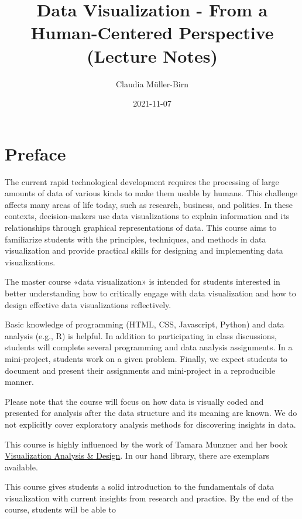 \documentclass[
]{book}
\title{Data Visualization - From a Human-Centered Perspective (Lecture Notes)}
\author{Claudia Müller-Birn}
\date{2021-11-07}
\begin{document}
\maketitle

{
\setcounter{tocdepth}{2}
\tableofcontents
}
\hypertarget{preface}{%
\chapter*{Preface}\label{preface}}


The current rapid technological development requires the processing of large amounts of data of various kinds to make them usable by humans. This challenge affects many areas of life today, such as research, business, and politics. In these contexts, decision-makers use data visualizations to explain information and its relationships through graphical representations of data. This course aims to familiarize students with the principles, techniques, and methods in data visualization and provide practical skills for designing and implementing data visualizations.

The master course «data visualization» is intended for students interested in better understanding how to critically engage with data visualization and how to design effective data visualizations reflectively.

Basic knowledge of programming (HTML, CSS, Javascript, Python) and data analysis (e.g., R) is helpful. In addition to participating in class discussions, students will complete several programming and data analysis assignments. In a mini-project, students work on a given problem. Finally, we expect students to document and present their assignments and mini-project in a reproducible manner.

Please note that the course will focus on how data is visually coded and presented for analysis after the data structure and its meaning are known. We do not explicitly cover exploratory analysis methods for discovering insights in data.

This course is highly influenced by the work of Tamara Munzner and her book \href{https://www.routledge.com/Visualization-Analysis-and-Design/Munzner/p/book/9781466508910}{Visualization Analysis \& Design}. In our hand library, there are exemplars available.

This course gives students a solid introduction to the fundamentals of data visualization with current insights from research and practice. By the end of the course, students will be able to
\end{document}
